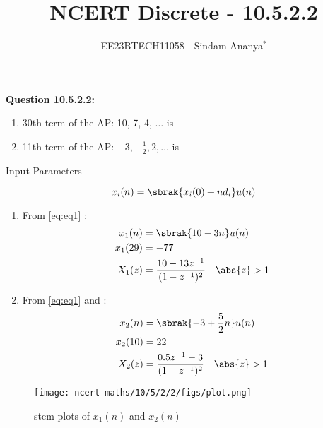 \documentclass[journal,12pt,twocolumn]{IEEEtran}
\theoremstyle{remark}
\begin{document}

\vspace{3cm}

\title{NCERT Discrete - 10.5.2.2}
\author{EE23BTECH11058 - Sindam Ananya$^{*}$%
}
\maketitle
\newpage
\bigskip

\renewcommand{\thefigure}{\theenumi}
\renewcommand{\thetable}{\theenumi}

\vspace{3cm}
\textbf{Question 10.5.2.2:} 
\begin{enumerate}
\item 30th term of the AP: 10, 7, 4, $\ldots$ is 
\item 11th term of the AP: $-3, -\frac{1}{2}, 2, \ldots$ is
\end{enumerate}
\solution
\fi
\begin{table}[h!]
    \centering
    
    \caption{Input Parameters}
    \label{tab:table1}
    \end{table}
\begin{equation}
    x_i(n) = \sbrak{x_i(0) + nd_i} u(n)
    \label{eq:eq1}
\end{equation}
\begin{enumerate}
\item From \eqref{eq:eq1}  :
\begin{align}
x_1(n) &= \sbrak{10 -3n}u(n)\\
x_1(29) &= -77\\
X_1(z) &= \frac{10 - 13z^{-1}}{(1-z^{-1})^2} \quad \abs{z} > 1
\end{align}
\item From \eqref{eq:eq1} and  :
\begin{align}
x_2(n) &= \sbrak{-3 + \frac{5}{2}n}u(n)\\
x_2(10) &= 22\\
X_2(z) &= \frac{0.5z^{-1}-3}{(1-z^{-1})^2} \quad \abs{z}> 1
\end{align}
\end{enumerate}
\begin{figure}[h!]
    \centering
    \texttt{[image: ncert-maths/10/5/2/2/figs/plot.png]}
    \caption{stem plots of $x_1(n)$ and $x_2(n)$}
    \label{fig:1}
\end{figure}
\end{document}
